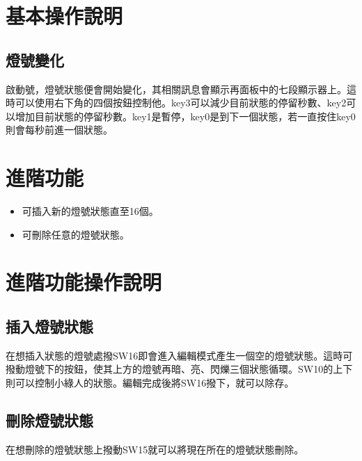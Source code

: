 \documentclass[11pt,a4paper]{article}
\begin{document}
\section{基本操作說明}

\subsection{燈號變化}
啟動號，燈號狀態便會開始變化，其相關訊息會顯示再面板中的七段顯示器上。這時可以使用右下角的四個按鈕控制他。key3可以減少目前狀態的停留秒數、key2可以增加目前狀態的停留秒數。key1是暫停，key0是到下一個狀態，若一直按住key0則會每秒前進一個狀態。

\section{進階功能}
\begin{itemize}
\item 可插入新的燈號狀態直至16個。
\item 可刪除任意的燈號狀態。
\end{itemize}

\section{進階功能操作說明}

\subsection{插入燈號狀態}
在想插入狀態的燈號處撥SW16即會進入編輯模式產生一個空的燈號狀態。這時可撥動燈號下的按鈕，使其上方的燈號再暗、亮、閃爍三個狀態循環。SW10的上下則可以控制小綠人的狀態。編輯完成後將SW16撥下，就可以除存。\\
\subsection{刪除燈號狀態}
在想刪除的燈號狀態上撥動SW15就可以將現在所在的燈號狀態刪除。\\
\end{document}
